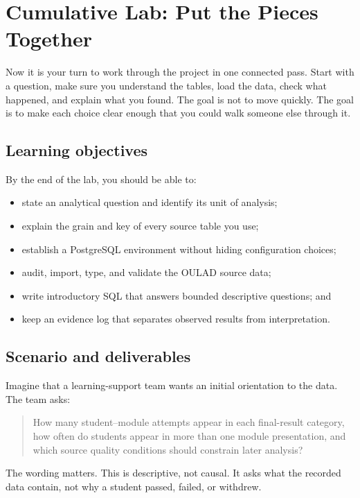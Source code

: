 \chapter{Cumulative Lab: Put the Pieces Together}
\label{ch:cumulative-lab}

\begin{plainlanguage}
Now it is your turn to work through the project in one connected pass. Start
with a question, make sure you understand the tables, load the data, check what
happened, and explain what you found. The goal is not to move quickly. The goal
is to make each choice clear enough that you could walk someone else through
it.
\end{plainlanguage}

\section{Learning objectives}

By the end of the lab, you should be able to:
\begin{itemize}
  \item state an analytical question and identify its unit of analysis;
  \item explain the grain and key of every source table you use;
  \item establish a PostgreSQL environment without hiding configuration choices;
  \item audit, import, type, and validate the OULAD source data;
  \item write introductory SQL that answers bounded descriptive questions; and
  \item keep an evidence log that separates observed results from interpretation.
\end{itemize}

\section{Scenario and deliverables}

Imagine that a learning-support team wants an initial orientation to the data.
The team asks:

\begin{quote}
How many student--module attempts appear in each final-result category, how
often do students appear in more than one module presentation, and which source
quality conditions should constrain later analysis?
\end{quote}

The wording matters. This is descriptive, not causal. It asks what the recorded
data contain, not why a student passed, failed, or withdrew.

